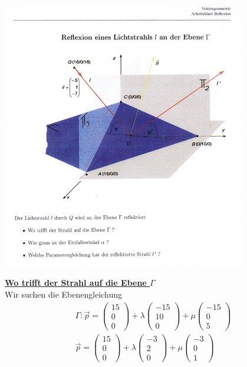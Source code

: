 \begin{myexample}
\begin{center}
	\includegraphics[width=0.8\textwidth]{imgs/Reflexion_Lichtstrahl.png}
\end{center}
\underline{\textbf{Wo trifft der Strahl auf die Ebene $\Gamma$}}\\
Wir suchen die Ebenengleichung
\begin{eqnarray*}
	\Gamma : \vec{p} = \begin{pmatrix}15\\0\\0\end{pmatrix}+ \lambda \begin{pmatrix}-15\\10\\0\end{pmatrix} + \mu \begin{pmatrix}-15\\0\\5\end{pmatrix}\\
	\vec{p} = \begin{pmatrix}15\\0\\0\end{pmatrix}+ \lambda \begin{pmatrix}-3\\2\\0\end{pmatrix} + \mu \begin{pmatrix}-3\\0\\1\end{pmatrix}\\

\end{eqnarray*}
\end{myexample}
